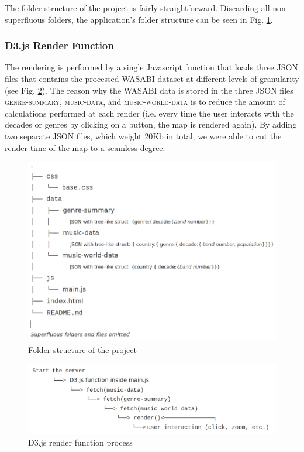 \documentclass[twocolumn, letterpaper,13pt]{scrartcl}
\begin{document}
    The folder structure of the project is fairly straightforward. Discarding all non-superfluous folders, the application's folder structure can be seen in Fig. \ref{fig:d}.
    
    \subsubsection*{D3.js Render Function}
    
    The rendering is performed by a single Javascript function that loads three JSON files that contains the processed WASABI dataset at different levels of granularity (see Fig. \ref{fig:e}).
    \newline\newline
    The reason why the WASABI data is stored in the three JSON files \textsc{genre-summary}, \textsc{music-data}, and \textsc{music-world-data} is to reduce the amount of calculations performed at each render (i.e. every time the user interacts with the decades or genres by clicking on a button, the map is rendered again). By adding two separate JSON files, which weight 20Kb in total, we were able to cut the render time of the map to a seamless degree.

    \begin{figure}	\includegraphics[width=0.98\linewidth]{folder_structure.png}
    \caption{Folder structure of the project\label{fig:d}}
    \end{figure}
    
    \begin{figure}	\includegraphics[width=0.98\linewidth]{action.png}
    \caption{D3.js render function process\label{fig:e}}
    \end{figure}
    
\end{document}
